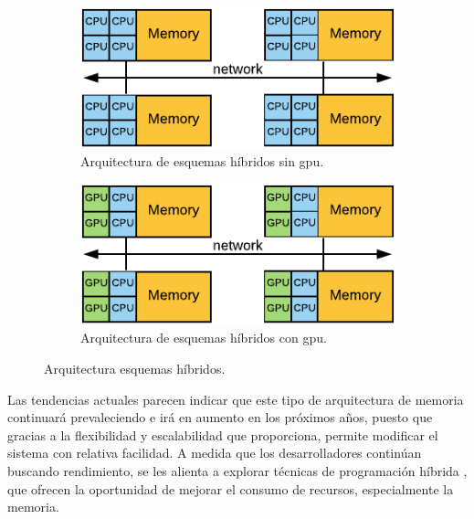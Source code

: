 \vspace{0.35cm}
\begin{figure}[htbp]
 	\begin{subfigure}{0.5\textwidth}
 	\includegraphics[width=\linewidth]{figures/hybrid_distributed_shared_memory}
 	\caption{Arquitectura de esquemas híbridos sin \acrshort{gpu}.}
 	\label{fig:chap2:hybrid_schemas_1}
 	\end{subfigure}
 	\hspace*{\fill} %
 	\begin{subfigure}{0.5\textwidth}
 	\includegraphics[width=\linewidth]{figures/hybrid_distributed_shared_memory_2}
 	\caption{Arquitectura de esquemas híbridos con \acrshort{gpu}.}
 	\label{fig:chap2:hybrid_schemas_2}
 	\end{subfigure}
 	\caption{Arquitectura esquemas híbridos.}
 	\label{fig:chap2:hybrid_schemas}
\end{figure}  
\vspace{0.35cm}

Las tendencias actuales parecen indicar que este tipo de arquitectura de memoria continuará prevaleciendo e irá en aumento en los próximos años, puesto que gracias a la flexibilidad y escalabilidad que proporciona, permite modificar el sistema con relativa facilidad. A medida que los desarrolladores continúan buscando rendimiento, se les alienta a explorar técnicas de programación híbrida \cite{rabenseifner2009hybrid}, que ofrecen la oportunidad de mejorar el consumo de recursos, especialmente la memoria.


